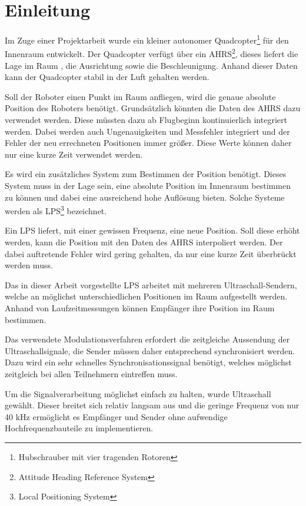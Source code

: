 \chapter{Einleitung}
\label{cha:Einleitung}

Im Zuge einer Projektarbeit wurde ein kleiner autonomer Quadcopter\footnote{Hubschrauber mit vier tragenden Rotoren} für den Innenraum entwickelt. Der Quadcopter verfügt über ein AHRS\footnote{Attitude Heading Reference System}, dieses liefert die Lage im Raum , die Ausrichtung sowie die Beschleunigung. Anhand dieser Daten kann der Quadcopter stabil in der Luft gehalten werden. 

Soll der Roboter einen Punkt im Raum anfliegen, wird die genaue absolute Position des Roboters benötigt. Grundsätzlich könnten die Daten des AHRS dazu verwendet werden. Diese müssten dazu ab Flugbeginn kontinuierlich integriert werden. Dabei werden auch Ungenauigkeiten und Messfehler integriert und der Fehler der neu errechneten Positionen immer größer. Diese Werte können daher nur eine kurze Zeit verwendet werden.

Es wird ein zusätzliches System zum Bestimmen der Position benötigt. Dieses System muss in der Lage sein, eine absolute Position im Innenraum bestimmen zu können und dabei eine ausreichend hohe Auflösung bieten. Solche Systeme werden als LPS\footnote{Local Positioning System} bezeichnet.

Ein LPS liefert, mit einer gewissen Frequenz, eine neue Position. Soll diese erhöht werden, kann die Position mit den Daten des AHRS interpoliert werden. Der dabei auftretende Fehler wird gering gehalten, da nur eine kurze Zeit überbrückt werden muss. 

Das in dieser Arbeit vorgestellte LPS arbeitet mit mehreren Ultraschall-Sendern, welche an möglichst unterschiedlichen Positionen im Raum aufgestellt werden. Anhand von Laufzeitmessungen können Empfänger ihre Position im Raum bestimmen. 

Das verwendete Modulationsverfahren erfordert die zeitgleiche Aussendung der Ultraschallsignale, die Sender müssen daher entsprechend synchronisiert werden. Dazu wird ein sehr schnelles Synchronisationssignal benötigt, welches möglichst zeitgleich bei allen Teilnehmern eintreffen muss.

Um die Signalverarbeitung möglichst einfach zu halten, wurde Ultraschall gewählt. Dieser breitet sich relativ langsam aus und die geringe Frequenz von nur 40 kHz ermöglicht es Empfänger und Sender ohne aufwendige Hochfrequenzbauteile zu implementieren.

